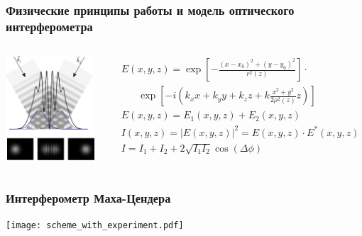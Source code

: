 \begin{frame}
\frametitle{Физические принципы работы и модель оптического интерферометра}
\begin{columns}
  \centering
  \includegraphics[width=0.9\linewidth]{images/interf_expl.png}


\begin{align*}
& E(x,y,z)=\exp \left[-\frac{\left(x-x_{0}\right)^{2}+\left(y-y_{0}\right)^{2}}{r^{2}(z)}\right] \cdot \\
& \hspace{20pt} \exp \left[-i\left(k_{x} x+k_{y} y+k_{z} z + k\frac{x^2+y^2}{2\rho^2(z)} z\right)\right] \\
& E(x, y, z) = E_1(x, y, z) + E_2(x, y, z) \\
& I(x, y, z) = |E(x, y, z)|^2 = E(x,y,z) \cdot E^*(x,y,z) \\
& I= I_1 + I_2 + 2 \sqrt{I_1I_2}\cos(\Delta \phi)
\end{align*}

\end{columns} 
\end{frame}

\begin{frame}
\frametitle{Интерферометр Маха-Цендера}
  \centering
  \texttt{[image: scheme\_with\_experiment.pdf]}
\end{frame}


